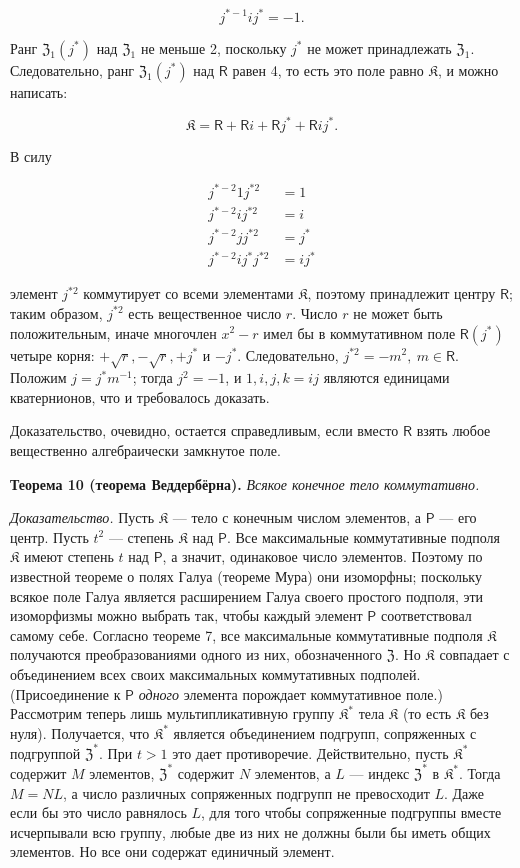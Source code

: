 \documentclass[11pt]{article}
\begin{document}
\[
j^{*-1}ij^*=-1.
\]

Ранг \(\mathfrak Z_1(j^*)\) над \(\mathfrak Z_1\) не меньше 2, поскольку \(j^*\) не может принадлежать \(\mathfrak Z_1\). Следовательно, ранг \(\mathfrak Z_1(j^*)\) над \(\mathsf{R}\) равен 4, то есть это поле равно \(\mathfrak K\), и можно написать:

\[
\mathfrak K=\mathsf R+\mathsf Ri+\mathsf Rj^*+\mathsf Rij^*.
\]

В силу

\[
\begin{aligned}
j^{*-2}1j^{*2}&=1\\
j^{*-2}ij^{*2}&=i\\
j^{*-2}jj^{*2}&=j^*\\
j^{*-2}ij^*j^{*2}&=ij^*
\end{aligned}
\]

элемент \(j^{*2}\) коммутирует со всеми элементами \(\mathfrak K\), поэтому принадлежит центру \(\mathsf{R}\); таким образом, \(j^{*2}\) есть вещественное число \(r\). Число \(r\) не может быть положительным, иначе многочлен \(x^2-r\) имел бы в коммутативном поле \(\mathsf{R}(j^*)\) четыре корня: \(+\sqrt r,-\sqrt r,+j^*\) и \(-j^*\). Следовательно, \(j^{*2}=-m^2,\ m\in \mathsf{R}\). Положим \(j=j^*m^{-1}\); тогда \(j^2=-1\), и \(1,i,j,k=ij\) являются единицами кватернионов, что и требовалось доказать.

Доказательство, очевидно, остается справедливым, если вместо \(\mathsf{R}\) взять любое вещественно алгебраически замкнутое поле.

\textbf{Теорема 10 (теорема Веддербёрна).} \emph{Всякое конечное тело коммутативно.}

\emph{Доказательство.} Пусть \(\mathfrak K\) --- тело с конечным числом элементов, а \(\mathsf P\) --- его центр. Пусть \(t^2\) --- степень \(\mathfrak K\) над \(\mathsf P\). Все максимальные коммутативные подполя \(\mathfrak K\) имеют степень \(t\) над \(\mathsf P\), а значит, одинаковое число элементов. Поэтому по известной теореме о полях Галуа (теореме Мура) они изоморфны; поскольку всякое поле Галуа является расширением Галуа своего простого подполя, эти изоморфизмы можно выбрать так, чтобы каждый элемент \(\mathsf P\) соответствовал самому себе. Согласно теореме 7, все максимальные коммутативные подполя \(\mathfrak K\) получаются преобразованиями одного из них, обозначенного \(\mathfrak Z\). Но \(\mathfrak K\) совпадает с объединением всех своих максимальных коммутативных подполей. (Присоединение к \(\mathsf P\) \emph{одного} элемента порождает коммутативное поле.) Рассмотрим теперь лишь мультипликативную группу \(\mathfrak K^*\) тела \(\mathfrak K\) (то есть \(\mathfrak K\) без нуля). Получается, что \(\mathfrak K^*\) является объединением подгрупп, сопряженных с подгруппой \(\mathfrak Z^*\). При \(t>1\) это дает противоречие. Действительно, пусть \(\mathfrak K^*\) содержит \(M\) элементов, \(\mathfrak Z^*\) содержит \(N\) элементов, а \(L\) --- индекс \(\mathfrak Z^*\) в \(\mathfrak K^*\). Тогда \(M=NL\), а число различных сопряженных подгрупп не превосходит \(L\). Даже если бы это число равнялось \(L\), для того чтобы сопряженные подгруппы вместе исчерпывали всю группу, любые две из них не должны были бы иметь общих элементов. Но все они содержат единичный элемент.
\end{document}
